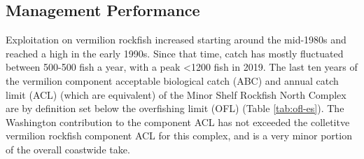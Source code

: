 \documentclass[11pt,
  english,
  a4paper,
]{article}
\begin{document}
\leavevmode\tagmcend\tagstructend\par



\clearpage


\hypertarget{management-performance}{%
\subsection*{Management Performance}\label{management-performance}}

\leavevmode\tagmcend\tagstructend


Exploitation on vermilion rockfish increased starting around the mid-1980s and reached a high in the early 1990s. Since that time, catch has mostly fluctuated between 500-500 fish a year, with a peak \textless1200 fish in 2019. The last ten years of the vermilion component acceptable biological catch (ABC) and annual catch limit (ACL) (which are equivalent) of the Minor Shelf Rockfish North Complex are by definition set below the overfishing limit (OFL) (Table \ref{tab:ofl-es}). The Washington contribution to the component ACL has not exceeded the colletitve vermilion rockfish component ACL for this complex, and is a very minor portion of the overall coastwide take.

\leavevmode\tagmcend\tagstructend\par

\begingroup\fontsize{10}{12}\selectfont
\begingroup\fontsize{10}{12}\selectfont
\end{document}

